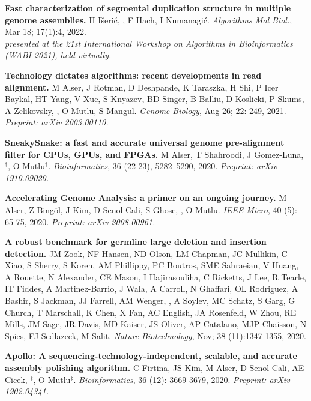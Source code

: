 \vspace{-.2cm}
{\bf Fast characterization of segmental duplication structure in multiple genome assemblies.}
H Išerić, \calkan{}, F Hach, I Numanagić.
{\it Algorithms Mol Biol.}, Mar 18; 17(1):4, 2022.\\
         \hspace*{1cm}
          {\footnotesize \em presented at the 21st International Workshop on Algorithms in Bioinformatics (WABI 2021), held virtually.}


\vspace{-.2cm}
{\bf Technology dictates algorithms: recent developments in read alignment.}
M Alser, J Rotman, D Deshpande, K Taraszka, H Shi, P Icer Baykal, HT Yang, V Xue, S Knyazev, BD Singer, B Balliu, D Koslicki, P Skums, A Zelikovsky, \calkan{}, O Mutlu, S Mangul.
{\it Genome Biology}, Aug 26; 22: 249, 2021.
\textit{Preprint: arXiv 2003.00110.}

\vspace{-.2cm}
{\bf SneakySnake: a fast and accurate universal genome pre-alignment filter for CPUs, GPUs, and FPGAs.} M Alser, T Shahroodi, J Gomez-Luna, \calkan{}$^\ddag$, O Mutlu$^\ddag$. {\it Bioinformatics}, 36 (22-23), 5282–5290, 2020. \textit {Preprint: arXiv 1910.09020.}

\vspace{-.2cm}
{\bf Accelerating Genome Analysis: a primer on an ongoing journey.} M Alser, Z Bingöl, J Kim, D Senol Cali, S Ghose, \calkan{}, O Mutlu. {\it IEEE Micro}, 40 (5): 65-75, 2020. \textit{Preprint: arXiv 2008.00961.}

\vspace{-.2cm}
 {\bf A robust benchmark for germline large deletion and insertion detection.}
 JM Zook, NF Hansen, ND Olson, LM Chapman, JC Mullikin, C Xiao, S Sherry, S Koren, AM Phillippy, PC Boutros, SME Sahraeian, V Huang, A Rouette, N Alexander, CE Mason, I Hajirasouliha, C Ricketts, J Lee, R Tearle, IT Fiddes, A Martinez-Barrio, J Wala, A Carroll, N Ghaffari, OL Rodriguez, A Bashir, S Jackman, JJ Farrell, AM Wenger, \calkan{}, A Soylev, MC Schatz, S Garg, G Church, T Marschall, K Chen, X Fan, AC English, JA Rosenfeld, W Zhou, RE Mills, JM Sage, JR Davis, MD Kaiser, JS Oliver, AP Catalano, MJP Chaisson, N Spies, FJ Sedlazeck, M Salit.
 {\it Nature Biotechnology}, Nov;  38 (11):1347-1355, 2020.
 
\vspace{-.2cm}
{\bf Apollo: A sequencing-technology-independent, scalable, and accurate assembly polishing algorithm.} C Firtina, JS Kim, M Alser, D Senol Cali, AE Cicek, \calkan{}$^\ddag$, O Mutlu$^\ddag$. {\it Bioinformatics}, 36 (12): 3669-3679, 2020.
\textit{Preprint: arXiv 1902.04341.}

